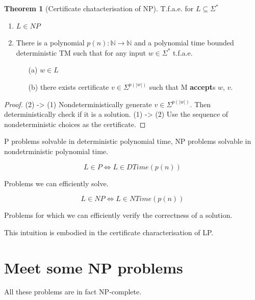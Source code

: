 \documentclass[a4paper,12pt]{article}
\theoremstyle{definition}
\newtheorem{theorem}[counter]{Theorem}
\theoremstyle{remark}
\newcommand{\N}{\mathbb{N}}
\begin{document}
\begin{theorem}[Certificate chatacterisation of NP]

    T.f.a.e. for $L \subseteq \Sigma^*$
    \begin{enumerate}
        \item $L \in NP$
        \item There is a polynomial $p(n): \N \to \N$ and a polynomial time bounded deterministic TM such that for any input $w \in \Sigma^*$ t.f.a.e.
        \begin{itemize}
            \item[(a)] $w \in L$
            \item[(b)] there exists certificate $v \in \Sigma^{p(|w|)}$ such that M \textbf{accept}s $w$, $v$.
        \end{itemize}
    \end{enumerate}

\end{theorem}

\begin{proof}
    (2) -> (1) Nondeterministically generate $v \in \Sigma^{p(|w|)}$. Then deterministically check if it is a solution.
    (1) -> (2) Use the sequence of nondeterministic choices as the certificate.
\end{proof}






\newpage
P problems solvable in deterministic polynomial time, NP problems solvable in nondetrministic polynomial time.

\begin{equation*}
    L \in P \iff L \in DTime(p(n))
\end{equation*}

Problems we can efficiently solve.

\begin{equation*}
    L \in NP \iff L \in NTime(p(n))
\end{equation*}


Problems for which we can efficiently verify the correctness of a solution.

This intuition is embodied in the certificate characterisation of LP.

\section{Meet some NP problems}
All these problems are in fact NP-complete.
\end{document}
